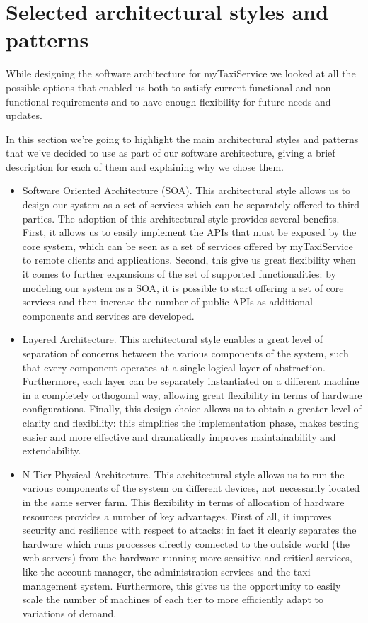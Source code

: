 \section{Selected architectural styles and patterns}
While designing the software architecture for myTaxiService we looked at all the possible options that enabled us both to satisfy current functional and non-functional requirements and to have enough flexibility for future needs and updates.

In this section we're going to highlight the main architectural styles and patterns that we've decided to use as part of our software architecture, giving a brief description for each of them and explaining why we chose them.

\begin{itemize}
	\item Software Oriented Architecture (SOA). This architectural style allows us to design our system as a set of services which can be separately offered to third parties. The adoption of this architectural style provides several benefits. First, it allows us to easily implement the APIs that must be exposed by the core system, which can be seen as a set of services offered by myTaxiService to remote clients and applications. Second, this give us great flexibility when it comes to further expansions of the set of supported functionalities: by modeling our system as a SOA, it is possible to start offering a set of core services and then increase the number of public APIs as additional components and services are developed. 
	\item Layered Architecture. This architectural style enables a great level of separation of concerns between the various components of the system, such that every component operates at a single logical layer of abstraction. Furthermore, each layer can be separately instantiated on a different machine in a completely orthogonal way, allowing great flexibility in terms of hardware configurations. Finally, this design choice allows us to obtain a greater level of clarity and flexibility: this simplifies the implementation phase, makes testing easier and more effective and dramatically improves maintainability and extendability.
	\item N-Tier Physical Architecture. This architectural style allows us to run the various components of the system on different devices, not necessarily located in the same server farm. This flexibility in terms of allocation of hardware resources provides a number of key advantages. First of all, it improves security and resilience with respect to attacks: in fact it clearly separates the hardware which runs processes directly connected to the outside world (the web servers) from the hardware running more sensitive and critical services, like the account manager, the administration services and the taxi management system. Furthermore, this gives us the opportunity to easily scale the number of machines of each tier to more efficiently adapt to variations of demand. 

\end{itemize}
